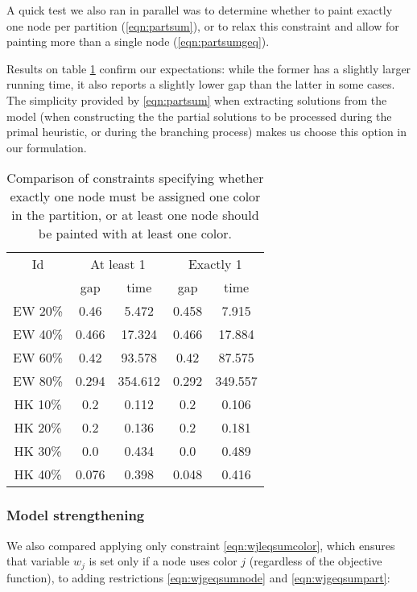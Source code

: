 A quick test we also ran in parallel was to determine whether to paint exactly one node per partition (\ref{eqn:partsum}), or to relax this constraint and allow for painting more than a single node (\ref{eqn:partsumgeq}). 

Results on table \ref{table:models:partsum} confirm our expectations: while the former has a slightly larger running time, it also reports a slightly lower gap than the latter in some cases. The simplicity provided by \ref{eqn:partsum} when extracting solutions from the model (when constructing the the partial solutions to be processed during the primal heuristic, or during the branching process) makes us choose this option in our formulation.

\begin{table}
\label{table:models:partsum}
\centering

\begin{tabular}{|c|cc|cc|}
\hline
\multicolumn{1}{|c|}{Id} & \multicolumn{2}{|c|}{At least 1} & \multicolumn{2}{|c|}{Exactly 1}
\\
 & gap & time & gap & time
\\
\hline
EW 20\% & 0.46 & 5.472 & 0.458 & 7.915
\\
EW 40\% & 0.466 & 17.324 & 0.466 & 17.884
\\
EW 60\% & 0.42 & 93.578 & 0.42 & 87.575
\\
EW 80\% & 0.294 & 354.612 & 0.292 & 349.557
\\
\hline
HK 10\% &  0.2 & 0.112 &  0.2 & 0.106
\\
HK 20\% &  0.2 & 0.136 &  0.2 & 0.181
\\
HK 30\% &  0.0 & 0.434 &  0.0 & 0.489
\\
HK 40\% & 0.076 & 0.398 & 0.048 & 0.416
\\
\hline 
 \end{tabular}

\caption{Comparison of constraints specifying whether exactly one node must be assigned one color in the partition, or at least one node should be painted with at least one color.}

\end{table}

\subsubsection{Model strengthening}

We also compared applying only constraint \ref{eqn:wjleqsumcolor}, which ensures that variable $w_j$ is set only if a node uses color $j$ (regardless of the objective function), to adding restrictions \ref{eqn:wjgeqsumnode} and \ref{eqn:wjgeqsumpart}:

